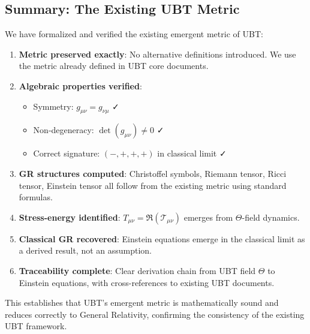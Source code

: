 \documentclass[12pt]{article}
\theoremstyle{definition}
\theoremstyle{remark}
\begin{document}
\subsection{Summary: The Existing UBT Metric}

We have formalized and verified the existing emergent metric of UBT:

\begin{enumerate}
    \item \textbf{Metric preserved exactly}: No alternative definitions introduced. We use the metric already defined in UBT core documents.
    
    \item \textbf{Algebraic properties verified}:
    \begin{itemize}
        \item Symmetry: $g_{\mu\nu} = g_{\nu\mu}$ ✓
        \item Non-degeneracy: $\det(g_{\mu\nu}) \neq 0$ ✓
        \item Correct signature: $(-,+,+,+)$ in classical limit ✓
    \end{itemize}
    
    \item \textbf{GR structures computed}: Christoffel symbols, Riemann tensor, Ricci tensor, Einstein tensor all follow from the existing metric using standard formulas.
    
    \item \textbf{Stress-energy identified}: $T_{\mu\nu} = \Re(\mathcal{T}_{\mu\nu})$ emerges from $\Theta$-field dynamics.
    
    \item \textbf{Classical GR recovered}: Einstein equations emerge in the classical limit as a derived result, not an assumption.
    
    \item \textbf{Traceability complete}: Clear derivation chain from UBT field $\Theta$ to Einstein equations, with cross-references to existing UBT documents.
\end{enumerate}

This establishes that UBT's emergent metric is mathematically sound and reduces correctly to General Relativity, confirming the consistency of the existing UBT framework.

\ifdefined\INCLUDEMODE
\else
  
\end{document}
